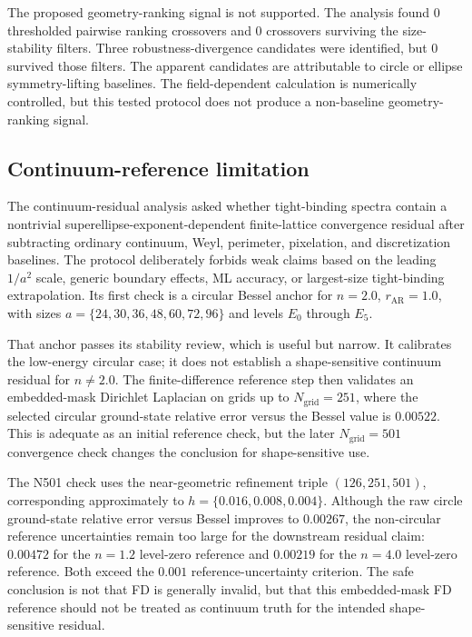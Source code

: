 The proposed geometry-ranking signal is not supported. The analysis found $0$
thresholded pairwise ranking crossovers and $0$ crossovers surviving the
size-stability filters. Three robustness-divergence candidates were identified,
but $0$ survived those filters. The apparent candidates are attributable to
circle or ellipse symmetry-lifting baselines. The field-dependent calculation is
numerically controlled, but this tested protocol does not produce a non-baseline
geometry-ranking signal.

\subsection{Continuum-reference limitation}

The continuum-residual analysis asked whether tight-binding spectra contain a
nontrivial superellipse-exponent-dependent finite-lattice convergence residual
after subtracting ordinary continuum, Weyl, perimeter, pixelation, and
discretization baselines. The protocol deliberately forbids weak claims based
on the leading $1/a^2$ scale, generic boundary effects, ML accuracy, or
largest-size tight-binding extrapolation. Its first check is a circular Bessel
anchor for $n=2.0$, $r_{\mathrm{AR}}=1.0$, with sizes
$a=\{24,30,36,48,60,72,96\}$ and levels $E_0$ through $E_5$.

That anchor passes its stability review, which is useful but narrow. It
calibrates the low-energy circular case; it does not establish a
shape-sensitive continuum residual for $n\neq2.0$. The finite-difference
reference step then validates an embedded-mask Dirichlet Laplacian on grids up
to $N_{\mathrm{grid}}=251$, where the selected circular ground-state relative
error versus the Bessel value is $0.00522$. This is adequate as
an initial reference check, but the later $N_{\mathrm{grid}}=501$ convergence
check changes the conclusion for shape-sensitive use.

The N501 check uses the near-geometric refinement triple $(126,251,501)$,
corresponding approximately to $h=\{0.016,0.008,0.004\}$. Although the raw
circle ground-state relative error versus Bessel improves to
$0.00267$, the non-circular reference uncertainties remain too
large for the downstream residual claim:
$0.00472$ for the $n=1.2$ level-zero reference and
$0.00219$ for the $n=4.0$ level-zero reference. Both exceed the
$0.001$ reference-uncertainty criterion. The safe conclusion is not that FD is
generally invalid, but that this embedded-mask FD reference should not be
treated as continuum truth for the intended shape-sensitive residual.

